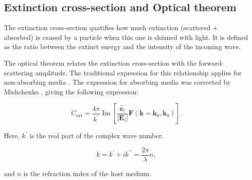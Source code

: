 \subsection{Extinction cross-section and Optical theorem} \label{sec:cext_ot}

The extinction cross-section quatifies how much extinction (scattered + absorbed) 
is caused by a particle when this one is shinned with light. It is defined as the
ratio between the extinct energy and the intensity of the incoming wave. 

The optical theorem relates the extinction cross-section with the forward-scattering amplitude. The traditional expression for this relationship applies for non-absorbing media \cite{MayergoyzZhang2007, Jackson}. The expression for absorbing media \cite{BohrenGilra1979, VideenSun2003} was corrected by Mishchenko \cite{Mishchenko2007}, giving the following expression:

\begin{equation*}
    C_\text{ext} = \frac{4\pi}{k^\prime} \operatorname{Im} \left[ \frac{\mathbf{\hat{e}}_i}{|\mathbf{E}_i|}\mathbf{F}(\mathbf{k}=\mathbf{k}_0, \mathbf{k}_0) \right].
\end{equation*}

Here, $k^\prime$ is the real part of the complex wave number. 

\begin{equation*}
    k = k^\prime + ik^{\prime\prime} = \frac{2\pi}{\lambda} n,
\end{equation*}

and $n$ is the refraction index of the host medium.
















